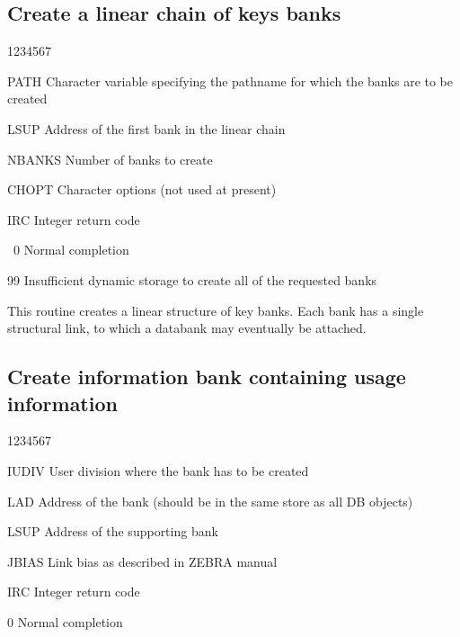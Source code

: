 \subsection{Create a linear chain of keys banks}


\begin{DLtt}{1234567}
\item[PATH]Character variable specifying the pathname for which
  the banks are to be created
\item[LSUP]Address of the first bank in the linear chain
\item[NBANKS]Number of banks to create
\item[CHOPT]Character options (not used at present)
\item[IRC]Integer return code
  \begin{DLtt}{12}
    \item[\ 0]Normal completion
    \item[99]Insufficient dynamic storage to create all of the requested banks
  \end{DLtt}
\end{DLtt}

This routine creates a linear structure of 
key banks. Each bank has a single structural link, to which
a databank may eventually be attached.

\subsection{Create information bank containing usage information}


\begin{DLtt}{1234567}
\item[IUDIV]User division where the  bank has to be created
\item[LAD]Address of the  bank (should be in the same store
  as all DB objects)
\item[LSUP]Address of the supporting bank
\item[JBIAS]Link bias as described in ZEBRA manual
\item[IRC]Integer return code
  \begin{DLtt}{1}
    \item[0]Normal completion
  \end{DLtt}
\end{DLtt}

